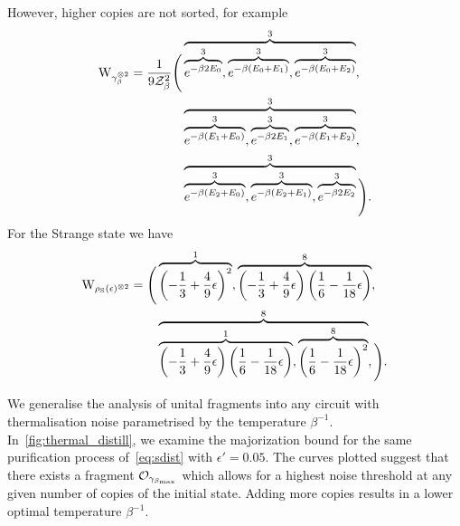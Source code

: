 \documentclass[pra,
aps,
twocolumn,
superscriptaddress,
groupedaddress,
nofootinbib,
reprint
]{revtex4-1}
\begin{document}
However, higher copies are not sorted, for example
\begin{equation}
	\begin{split}
	\W{\gamma_\beta\too{2}} = \frac{1}{9\Z_\beta^2} \Bigg( &\overbrace{\overbrace{e^{-\beta 2E_0}}^3, \overbrace{e^{-\beta (E_0 + E_1)}}^3, \overbrace{e^{-\beta (E_0 + E_2)}}^3}^3, \\
	 &\overbrace{\overbrace{e^{-\beta (E_1 + E_0)}}^3, \overbrace{e^{-\beta 2E_1}}^3, \overbrace{e^{-\beta (E_1 + E_2)}}^3}^3, \\
	 &\overbrace{\overbrace{e^{-\beta (E_2 + E_0)}}^3, \overbrace{e^{-\beta (E_2 + E_1)}}^3, \overbrace{e^{-\beta 2E_2}}^3}^3 \Bigg).
	\end{split}
\end{equation}
 For the Strange state we have
\begin{equation}
	\begin{split}
	\W{\noisys(\epsilon)\too{2}} = \Bigg( &\overbrace{\left( -\frac{1}{3} + \frac{4}{9}\epsilon \right)^2}^1, \overbrace{ \left( -\frac{1}{3} + \frac{4}{9}\epsilon \right) \left( \frac{1}{6} - \frac{1}{18}\epsilon \right)}^{8}, \\
	&\overbrace{\overbrace{ \left( -\frac{1}{3} + \frac{4}{9}\epsilon \right) \left( \frac{1}{6} - \frac{1}{18}\epsilon \right)}^1, \overbrace{\left( \frac{1}{6} - \frac{1}{18}\epsilon \right)^2}^8}^8,  \Bigg).
	\end{split}
\end{equation}

\null\newpage
\null\newpage

We generalise the analysis of unital fragments into any circuit with thermalisation noise parametrised by the temperature $\beta^{-1}$.
In~\cref{fig:thermal_distill}, we examine the majorization bound for the same purification process of~\cref{eq:sdist} with $\epsilon' = 0.05$.
The curves plotted suggest that there exists a fragment $\mathcal{O}_{\gamma_{\beta_{\rm{max}}}}$ which allows for a highest noise threshold at any given number of copies of the initial state.
Adding more copies results in a lower optimal temperature $\beta^{-1}$.
\end{document}
